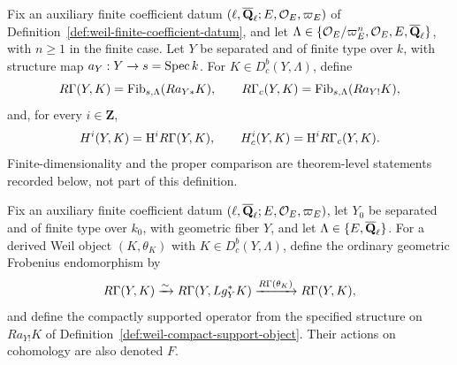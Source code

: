 
\begin{definition}
\label{def:cohomology-complexes}


Fix an auxiliary finite coefficient datum
\((\ell,\overline{\mathbf Q}_\ell;E,\mathcal O_E,\varpi_E)\) of
Definition~\ref{def:weil-finite-coefficient-datum}, and let
\(\Lambda\in\{\mathcal O_E/\varpi_E^n,\mathcal O_E,E,\overline{\mathbf Q}_\ell\}\), with
\(n\geq1\) in the finite case.  Let \(Y\) be separated and of finite type
over \(k\), with structure map
\(a_Y:Y\to s=\operatorname{Spec} k\).  For \(K\in D^b_c(Y,\Lambda)\), define
\[
 R\Gamma(Y,K)=\operatorname{Fib}_{s,\Lambda}(Ra_{Y*}K),\qquad
 R\Gamma_c(Y,K)=\operatorname{Fib}_{s,\Lambda}(Ra_{Y!}K),
\]
and, for every \(i\in\mathbf Z\),
\[
 H^i(Y,K)=\mathrm H^iR\Gamma(Y,K),\qquad
 H_c^i(Y,K)=\mathrm H^iR\Gamma_c(Y,K).
\]
Finite-dimensionality and the proper comparison are theorem-level
statements recorded below, not part of this definition.
\end{definition}


\begin{definition}
\label{def:global-geometric-frobenius}


Fix an auxiliary finite coefficient datum
\((\ell,\overline{\mathbf Q}_\ell;E,\mathcal O_E,\varpi_E)\), let \(Y_0\) be separated and of
finite type over \(k_0\), with geometric fiber \(Y\), and let
\(\Lambda\in\{E,\overline{\mathbf Q}_\ell\}\).  For a derived Weil object
\((K,\theta_K)\) with \(K\in D^b_c(Y,\Lambda)\), define the ordinary geometric
Frobenius endomorphism by
\[
 R\Gamma(Y,K)\xrightarrow{\sim}R\Gamma(Y,Lg_Y^*K)
 \xrightarrow{R\Gamma(\theta_K)}R\Gamma(Y,K),
\]
and define the compactly supported operator from the specified structure on
\(Ra_{Y!}K\) of Definition~\ref{def:weil-compact-support-object}.  Their
actions on cohomology are also denoted \(F\).
\end{definition}

